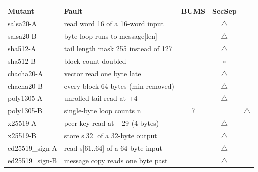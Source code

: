 \begin{tabular}{llcc}
\toprule
Mutant & Fault & BUMS & SecSep\\
\midrule
salsa20-A & read word 16 of a 16-word input &  & $\triangle$\\
salsa20-B & byte loop runs to message[len] &  & $\triangle$\\
sha512-A & tail length mask 255 instead of 127 &  & $\triangle$\\
sha512-B & block count doubled &  & $\circ$\\
chacha20-A & vector read one byte late &  & $\triangle$\\
chacha20-B & every block 64 bytes (min removed) &  & $\triangle$\\
poly1305-A & unrolled tail read at +4 &  & $\triangle$\\
poly1305-B & single-byte loop counts n&7 &  & $\triangle$\\
x25519-A & peer key read at +29 (4 bytes) &  & $\triangle$\\
x25519-B & store s[32] of a 32-byte output &  & $\triangle$\\
ed25519\_sign-A & read s[61..64] of a 64-byte input &  & $\triangle$\\
ed25519\_sign-B & message copy reads one byte past &  & $\triangle$\\
\bottomrule
\end{tabular}
